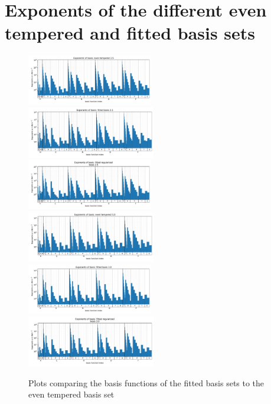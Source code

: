 \section{Exponents of the different even tempered and fitted basis sets}
\begin{figure}
    \centering
    \includegraphics[width=0.49\textwidth]{chapters/results/results_images/basis_functions_even_tempered_2.5}
    \includegraphics[width=0.5\textwidth]{chapters/results/results_images/basis_functions_fitted_basis_2.5}
    \includegraphics[width=0.49\textwidth]{chapters/results/results_images/basis_functions_fitted_regularized_basis_2.5}
    \includegraphics[width=0.5\textwidth]{chapters/results/results_images/basis_functions_even_tempered_3.0}
    \includegraphics[width=0.49\textwidth]{chapters/results/results_images/basis_functions_fitted_basis_3.0}
    \includegraphics[width=0.5\textwidth]{chapters/results/results_images/basis_functions_fitted_regularized_basis_3.0}
    \caption{Plots comparing the basis functions of the fitted basis sets to the even tempered basis set}
\end{figure}
